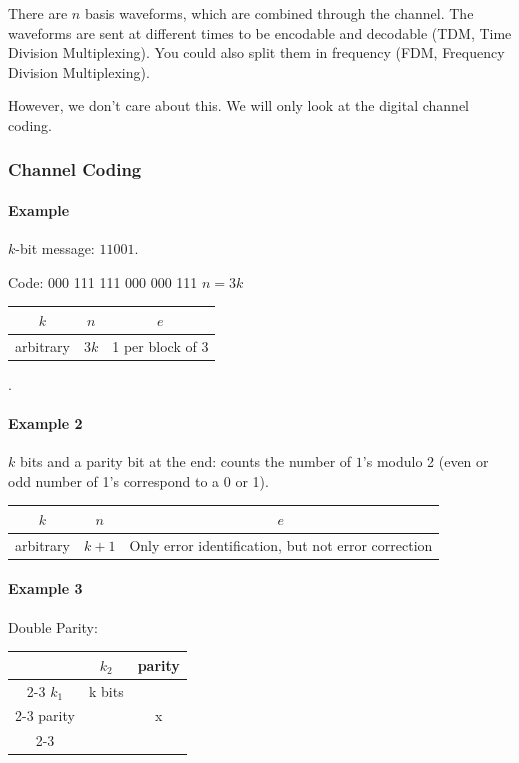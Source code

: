\documentclass[12pt]{article}
\begin{document}
There are $n$ basis waveforms, which are combined through the channel. The waveforms are sent at different times to be encodable and decodable (TDM, Time Division Multiplexing). You could also split them in frequency (FDM, Frequency Division Multiplexing).

However, we don't care about this. We will only look at the digital channel coding. 

\subsubsection{Channel Coding}
\paragraph{Example}
$k$-bit message: $11001.$

Code: 000 111 111 000 000 111
$n=3k$

\smallskip
\begin{tabular}{|c|c|c|}
    \hline
    $k$&$n$&$e$\\
    \hline
    arbitrary&$3k$&1 per block of 3 \\
    \hline
\end{tabular}.
\paragraph{Example 2}
$k$ bits and a parity bit at the end: counts the number of $1$'s modulo 2 (even or odd number of 1's correspond to a 0 or 1).

\smallskip
\begin{tabular}{|c|c|c|}
    \hline
    $k$&$n$&$e$\\
    \hline
    arbitrary&$k+1$&Only error identification, but not error correction \\
    \hline
\end{tabular}


\paragraph{Example 3}
Double Parity:

\smallskip
\begin{tabular}{c|c|c|}
    \multicolumn{1}{c}{} & \multicolumn{1}{c}{$k_2$} & \multicolumn{1}{c}{parity} \\
    \cline{2-3}
    $k_1$ & k bits & \\
    \cline{2-3}
    parity & & x \\
    \cline{2-3}
\end{tabular}
\end{document}
